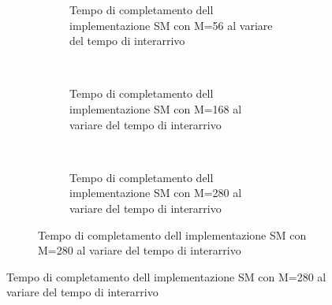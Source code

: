 \documentclass[a4paper]{article}
\begin{document}
\begin{figure}[!h]
\begin{subfigure}[b]{.5\columnwidth}
\begin{subfigure}[b]{\textwidth}
      \resizebox{\columnwidth}{!}{}
      \caption{Tempo di completamento dell implementazione SM con M=56 al variare del tempo di interarrivo}
      \label{fig:scalability_SM_size56}
    \end{subfigure}
    ~
    \begin{subfigure}[b]{\textwidth}
      \centering
      \addtocounter{subfigure}{-1}
      \renewcommand\thesubfigure{\alph{subfigure}2}
      \resizebox{\columnwidth}{!}{}
      \caption{Tempo di completamento dell implementazione SM con M=168 al variare del tempo di interarrivo}
      \label{fig:scalability_SM_size168}
    \end{subfigure}
    ~
    \begin{subfigure}[b]{\textwidth}
      \centering
      \addtocounter{subfigure}{-1}
      \renewcommand\thesubfigure{\alph{subfigure}3}
      \resizebox{\columnwidth}{!}{}
      \caption{Tempo di completamento dell implementazione SM con M=280 al variare del tempo di interarrivo}
      \label{fig:scalability_SM_size280}
    \end{subfigure}
    \label{fig:allscalability_SM}
  \end{subfigure}
\end{figure}
\end{document}
